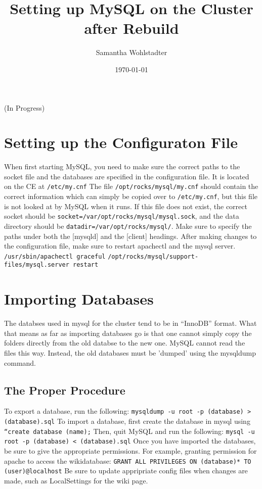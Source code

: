 \documentclass[12pt]{article}
\begin{document}
\title{Setting up MySQL on the Cluster after Rebuild}
\date{\today}
\author{Samantha Wohlstadter}
\thispagestyle{empty}
\maketitle

(In Progress)

\section{Setting up the Configuraton File}

 When first starting MySQL, you need to make sure the correct paths to the socket file and the databases are specified in the configuration file. It is located on the CE at {\tt /etc/my.cnf}
 The file {\tt /opt/rocks/mysql/my.cnf} should contain the correct information which can simply be copied over to {\tt /etc/my.cnf}, but this file is not looked at by MySQL when it runs. If this file does not exist, the correct socket should be {\tt socket=/var/opt/rocks/mysql/mysql.sock}, and the data directory should be {\tt datadir=/var/opt/rocks/mysql/}. Make sure to specify the paths under both the [mysqld] and the [client] headings.
 After making changes to the configuration file, make sure to restart apachectl and the mysql server.
    {\tt /usr/sbin/apachectl graceful}
    {\tt /opt/rocks/mysql/support-files/mysql.server restart }

\section{Importing Databases}
The databses used in mysql for the cluster tend to be in ``InnoDB'' format. What that means as far as importing databases go is that one cannot simply copy the folders directly from the old databse to the new one. MySQL cannot read the files this way. Instead, the old databases must be 'dumped' using the mysqldump command.

\subsection{The Proper Procedure}
To export a database, run the following:
    {\tt mysqldump -u root -p (database) > (database).sql}
To import a database, first create the database in mysql using {\tt ``create database (name);} Then, quit MySQL and run the following: 
    {\tt mysql -u root -p (database) < (database).sql}    
Once you have imported the databases, be sure to give the appropriate permissions. For example, granting permission for apache to access the wikidatabase:
    {\tt GRANT ALL PRIVILEGES ON (database)* TO (user)@localhost}
Be sure to update appripriate config files when changes are made, such as LocalSettings for the wiki page. 
\end{document}

